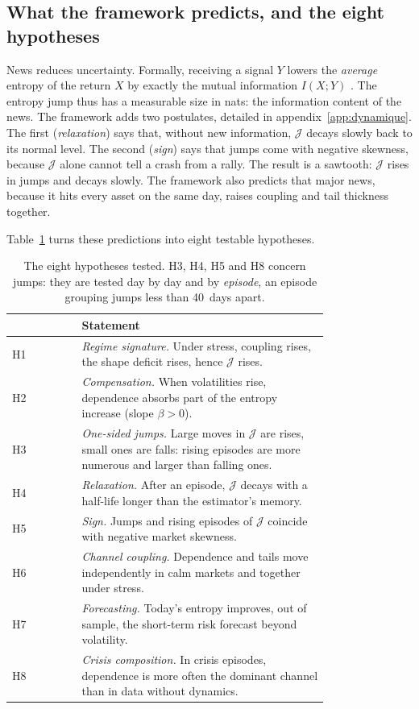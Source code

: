 \documentclass[11pt]{article}
\theoremstyle{definition}
\newcommand{\JJ}{\mathcal{J}}
\begin{document}
\subsection{What the framework predicts, and the eight hypotheses}

News reduces uncertainty. Formally, receiving a signal $Y$ lowers the
\emph{average} entropy of the return $X$ by exactly the mutual information
$I(X;Y)$ \citep{cover2006}. The entropy jump thus has a measurable size in
nats: the information content of the news. The framework adds two postulates,
detailed in appendix~\ref{app:dynamique}. The first (\emph{relaxation}) says
that, without new information, $\JJ$ decays slowly back to its normal level.
The second (\emph{sign}) says that jumps come with negative skewness, because
$\JJ$ alone cannot tell a crash from a rally. The result is a sawtooth: $\JJ$
rises in jumps and decays slowly. The framework also predicts that major news,
because it hits every asset on the same day, raises coupling and tail
thickness together.

Table~\ref{tab:hyp} turns these predictions into eight testable hypotheses.

\begin{table}[htbp]
\centering
\small
\begin{tabular}{@{}lp{0.78\linewidth}@{}}
\toprule
& Statement \\
\midrule
H1 & \emph{Regime signature.} Under stress, coupling rises, the shape deficit
rises, hence $\JJ$ rises. \\
H2 & \emph{Compensation.} When volatilities rise, dependence absorbs part of
the entropy increase (slope $\beta>0$). \\
H3 & \emph{One-sided jumps.} Large moves in $\JJ$ are rises, small ones are
falls: rising episodes are more numerous and larger than falling ones. \\
H4 & \emph{Relaxation.} After an episode, $\JJ$ decays with a half-life longer
than the estimator's memory. \\
H5 & \emph{Sign.} Jumps and rising episodes of $\JJ$ coincide with negative
market skewness. \\
H6 & \emph{Channel coupling.} Dependence and tails move independently in calm
markets and together under stress. \\
H7 & \emph{Forecasting.} Today's entropy improves, out of sample, the
short-term risk forecast beyond volatility. \\
H8 & \emph{Crisis composition.} In crisis episodes, dependence is more often
the dominant channel than in data without dynamics. \\
\bottomrule
\end{tabular}
\caption{The eight hypotheses tested. H3, H4, H5 and H8 concern jumps: they
are tested day by day and by \emph{episode}, an episode grouping jumps less
than 40~days apart.}
\label{tab:hyp}
\end{table}
\end{document}
